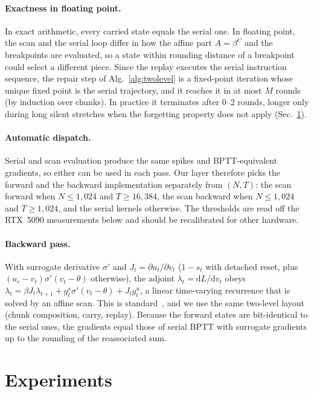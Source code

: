 \documentclass[10pt]{article}
\theoremstyle{remark}
\begin{document}
\paragraph{Exactness in floating point.}
In exact arithmetic, every carried state equals the serial one. In floating point, the scan and the serial loop differ in how the affine part $A=\beta^C$ and the breakpoints are evaluated, so a state within rounding distance of a breakpoint could select a different piece. Since the replay executes the serial instruction sequence, the repair step of Alg.~\ref{alg:twolevel} is a fixed-point iteration whose unique fixed point is the serial trajectory, and it reaches it in at most $M$ rounds (by induction over chunks). In practice it terminates after 0--2 rounds, longer only during long silent stretches when the forgetting property does not apply (Sec.~\ref{sec:exp}).

\paragraph{Automatic dispatch.}
Serial and scan evaluation produce the same spikes and BPTT-equivalent gradients, so either can be used in each pass. Our layer therefore picks the forward and the backward implementation separately from $(N,T)$: the scan forward when $N\le1{,}024$ and $T\ge16{,}384$, the scan backward when $N\le1{,}024$ and $T\ge1{,}024$, and the serial kernels otherwise. The thresholds are read off the RTX~5090 measurements below and should be recalibrated for other hardware.

\paragraph{Backward pass.}
With surrogate derivative $\sigma'$ and $J_t=\partial u_t/\partial v_t$ ($1-s_t$ with detached reset, plus $(u_r-v_t)\sigma'(v_t-\theta)$ otherwise), the adjoint $\lambda_t=\mathrm dL/\mathrm dv_t$ obeys
$\lambda_t=\beta J_t\lambda_{t+1}+g^s_t\sigma'(v_t-\theta)+J_tg^u_t$,
a linear time-varying recurrence that is solved by an affine scan. This is standard~\citep{he2026fidlif,tachyon2026}, and we use the same two-level layout (chunk composition, carry, replay). Because the forward states are bit-identical to the serial ones, the gradients equal those of serial BPTT with surrogate gradients up to the rounding of the reassociated sum.

\section{Experiments}
\label{sec:exp}
\end{document}
